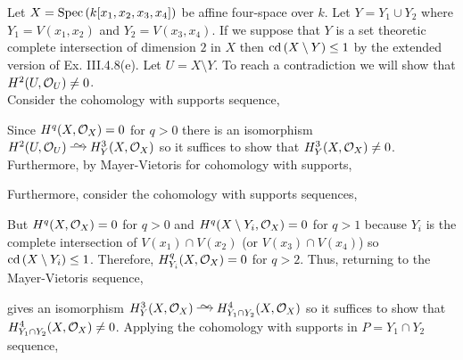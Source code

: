 \documentclass[12pt]{article}
\begin{document}
Let $X = \mathrm{Spec}\left( k[x_1,x_2,x_3,x_4] \right)$ be affine four-space over $k$. Let $Y = Y_1 \cup Y_2$ where $Y_1 = V(x_1, x_2)$ and $Y_2 = V(x_3, x_4)$. If we suppose that $Y$ is a set theoretic complete intersection of dimension $2$ in $X$ then $\mathrm{cd}\left( X \setminus Y \right) \le 1$ by the extended version of Ex. III.4.8(e). Let $U = X \setminus Y$. To reach a contradiction we will show that $H^2(U, \mathcal{O}_{U}) \neq 0$.
\bigskip\\
Consider the cohomology with supports sequence,
\begin{center}
\end{center}
Since $H^q(X, \mathcal{O}_{X}) = 0$ for $q > 0$ there is an isomorphism $H^2(U, \struct{U}) \iso H^3_Y(X, \struct{X})$ so it suffices to show that $H^3_Y(X, \mathcal{O}_{X}) \neq 0$. Furthermore, by Mayer-Vietoris for cohomology with supports,
\begin{center}
\end{center}
Furthermore, consider the cohomology with supports sequences,
\begin{center}
\end{center}
But $H^q(X, \mathcal{O}_{X}) = 0$ for $q > 0$ and $H^q(X \setminus Y_i, \mathcal{O}_{X}) = 0$ for $q > 1$ because $Y_i$ is the complete intersection of $V(x_1) \cap V(x_2)$ (or $V(x_3) \cap V(x_4)$) so $\mathrm{cd}\left( X \setminus Y_i \right) \le 1$. Therefore, $H^q_{Y_i}(X, \mathcal{O}_{X}) = 0$ for $q > 2$. Thus, returning to the Mayer-Vietoris sequence,
\begin{center}
\end{center}
gives an isomorphism $H^3_Y(X, \struct{X}) \iso H^4_{Y_1 \cap Y_2}(X, \struct{X})$ so it suffices to show that $H^4_{Y_1 \cap Y_2}(X, \mathcal{O}_{X}) \neq 0$. Applying the cohomology with supports in $P = Y_1 \cap Y_2$ sequence,
\end{document}

